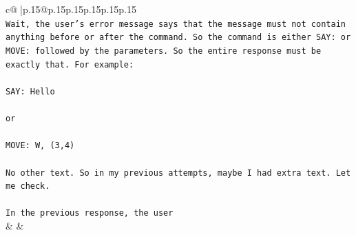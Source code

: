 \documentclass{article}
\begin{document}
{\begin{supertabular}{c@{$\;$}|p{.15\linewidth}@{}p{.15\linewidth}p{.15\linewidth}p{.15\linewidth}p{.15\linewidth}p{.15\linewidth}}
{{{\\ 
\texttt{Wait, the user's error message says that the message must not contain anything before or after the command. So the command is either SAY: or MOVE: followed by the parameters. So the entire response must be exactly that. For example:} \\
\\ 
\texttt{SAY: Hello} \\
\\ 
\texttt{or} \\
\\ 
\texttt{MOVE: W, (3,4)} \\
\\ 
\texttt{No other text. So in my previous attempts, maybe I had extra text. Let me check.} \\
\\ 
\texttt{In the previous response, the user} \\
            }
        }
    }
    & & \\ \\


\end{supertabular}}
\end{document}
